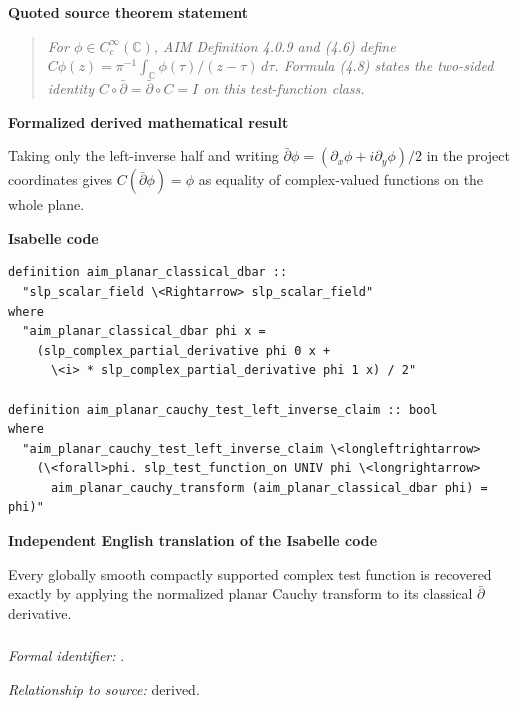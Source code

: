 \documentclass[10pt,oneside]{article}
\newenvironment{sourcequote}{\begin{quote}\itshape}{\end{quote}}
\newcommand{\reviewlabel}[1]{\par\smallskip\noindent\textsf{\bfseries #1}\par\smallskip}
\begin{document}
\reviewlabel{Quoted source theorem statement}
\begin{sourcequote}
For $\phi\in C_c^\infty(\mathbb C)$, AIM Definition 4.0.9 and (4.6) define $C\phi(z)=\pi^{-1}\int_{\mathbb C}\phi(\tau)/(z-\tau)\,d\tau$. Formula (4.8) states the two-sided identity $C\circ\bar\partial=\bar\partial\circ C=I$ on this test-function class.
\end{sourcequote}

\reviewlabel{Formalized derived mathematical result}
Taking only the left-inverse half and writing $\bar\partial\phi=(\partial_x\phi+i\partial_y\phi)/2$ in the project coordinates gives $C(\bar\partial\phi)=\phi$ as equality of complex-valued functions on the whole plane.

\reviewlabel{Isabelle code}
\begin{lstlisting}
definition aim_planar_classical_dbar ::
  "slp_scalar_field \<Rightarrow> slp_scalar_field"
where
  "aim_planar_classical_dbar phi x =
    (slp_complex_partial_derivative phi 0 x +
      \<i> * slp_complex_partial_derivative phi 1 x) / 2"

definition aim_planar_cauchy_test_left_inverse_claim :: bool
where
  "aim_planar_cauchy_test_left_inverse_claim \<longleftrightarrow>
    (\<forall>phi. slp_test_function_on UNIV phi \<longrightarrow>
      aim_planar_cauchy_transform (aim_planar_classical_dbar phi) = phi)"
\end{lstlisting}

\reviewlabel{Independent English translation of the Isabelle code}
Every globally smooth compactly supported complex test function is recovered exactly by applying the normalized planar Cauchy transform to its classical $\bar\partial$ derivative.

\subsubsection{\texttt{}}
\noindent\textit{Formal identifier:} \texttt{}.\par
\noindent\textit{Relationship to source:} derived.
\end{document}
